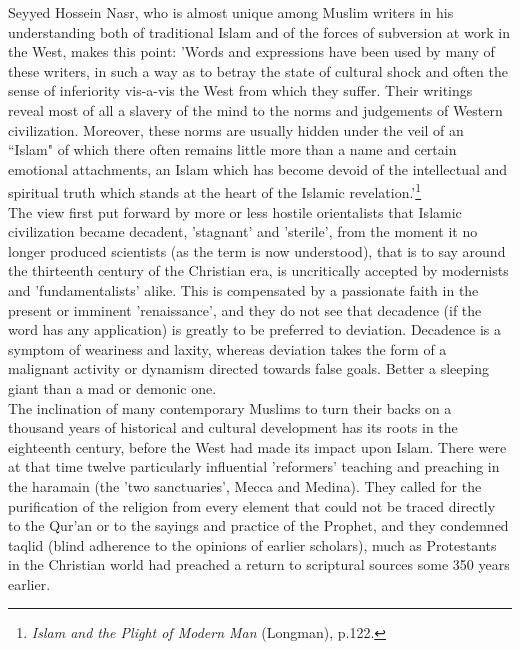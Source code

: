 \documentclass[10pt, twoside]{book}
\begin{document}
Seyyed Hossein Nasr, who is almost unique among Muslim writers in his understanding both of traditional Islam and of the forces of subversion at work in the West, makes this point: 'Words and expressions have been used by many of these writers, in such a way as to betray the state of cultural shock and often the sense of inferiority vis\hyp{}a\hyp{}vis the West from which they suffer. Their writings reveal most of all a slavery of the mind to the norms and judgements of Western civilization. Moreover, these norms are usually hidden under the veil of an ``Islam" of which there often remains little more than a name and certain emotional attachments, an Islam which has become devoid of the intellectual and spiritual truth which stands at the heart of the Islamic revelation.'\footnote{\emph{Islam and the Plight of Modern Man} (Longman), p.122.}\\


The view first put forward by more or less hostile orientalists that Islamic civilization became decadent, 'stagnant' and 'sterile', from the moment it no longer produced scientists (as the term is now understood), that is to say around the thirteenth century of the Christian era, is uncritically accepted by modernists and 'fundamentalists' alike. This is compensated by a passionate faith in the present or imminent 'renaissance', and they do not see that decadence (if the word has any application) is greatly to be preferred to deviation. Decadence is a symptom of weariness and laxity, whereas deviation takes the form of a malignant activity or dynamism directed towards false goals. Better a sleeping giant than a mad or demonic one. \\

The inclination of many contemporary Muslims to turn their backs on a thousand years of historical and cultural development has its roots in the eighteenth century, before the West had made its impact upon Islam. There were at that time twelve particularly influential 'reformers' teaching and preaching in the haramain (the 'two sanctuaries', Mecca and Medina). They called for the purification of the religion from every element that could not be traced directly to the Qur'an or to the sayings and practice of the Prophet, and they condemned taqlid (blind adherence to the opinions of earlier scholars), much as Protestants in the Christian world had preached a return to scriptural sources some 350 years earlier. \\
\end{document}
